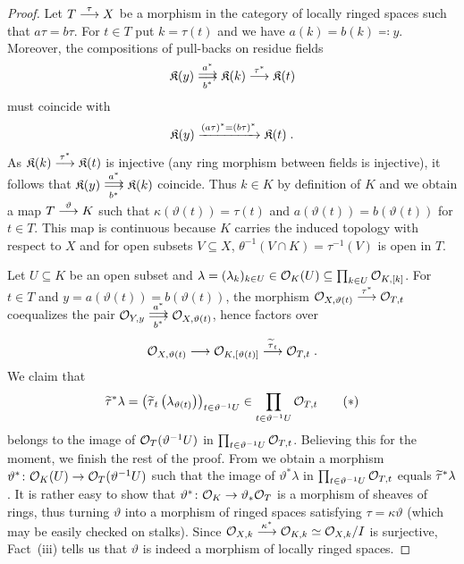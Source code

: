 \documentclass[a4paper,parskip=half,numbers=enddot, DIV=12]{scrreprt}
\begin{document}
\begin{proof}
	Let $T\morphism[\tau]X$ be a morphism in the category of locally ringed spaces such that $a\tau=b\tau$. For $t\in T$ put $k=\tau(t)$ and we have $a(k)=b(k)\eqqcolon y$. Moreover, the compositions of pull-backs on residue fields
	\begin{align*}
		\KK(y)\doublemorphism[\smash{a^*}][\smash{b^*}]\KK(k)\morphism[\tau^*]\KK(t)
	\end{align*}
	must coincide with
	\begin{align*}
		\mathfrak{K}(y)\xrightarrow{(a\tau)^*=(b\tau)^*}\mathfrak{K}(t)\;.
	\end{align*}
	As $\KK(k)\morphism[\tau^*]\KK(t)$ is injective (any ring morphism between fields is injective), it follows that $\KK(y)\doublemorphism[a^*][b^*]\KK(k)$ coincide. Thus $k\in K$ by definition of $K$ and we obtain a map $T\morphism[\vartheta]K$ such that $\kappa(\vartheta(t))=\tau(t)$ and $a(\vartheta(t))=b(\vartheta(t))$ for $t\in T$. This map is continuous because $K$ carries the induced topology with respect to $X$ and for open subsets $V\subseteq X$, $\theta^{-1}(V\cap K)=\tau^{-1}(V)$ is open in $T$.
	
	Let $U\subseteq K$ be an open subset and $\lambda=(\lambda_k)_{k\in U}\in\mathcal{O}_K(U)\subseteq\prod_{k\in U}\mathcal{O}_{K,[k]}$. For $t\in T$ and $y=a(\vartheta(t))=b(\vartheta(t))$, the morphism $\Oo_{X,\vartheta(t)}\morphism[\tau^*]\Oo_{T,t}$ coequalizes the pair $\Oo_{Y,y}\doublemorphism[\smash{a^*}][\smash{b^*}]\Oo_{X,\vartheta(t)}$, hence factors over
	\begin{align*}
		\Oo_{X,\vartheta(t)}\morphism\Oo_{K,[\vartheta(t)]}\morphism[\snake{\tau}_t]\Oo_{T,t}\;.
	\end{align*}
	We claim that
	\begin{align}\lbl{eq:bruteForcePullback}
		\snake{\tau}^*\lambda=\left(\snake{\tau}_t\left(\lambda_{\vartheta(t)}\right)\right)_{t\in\vartheta^{-1}U}\in\prod_{t\in\vartheta^{-1}U}\Oo_{T,t}\tag{$*$}
	\end{align}
	belongs to the image of $\mathcal{O}_T(\vartheta^{-1}U)$ in $\prod_{t\in\vartheta^{-1}U}\mathcal{O}_{T,t}$. Believing this for the moment, we finish the rest of the proof. From  we obtain a morphism $\vartheta^*\colon\Oo_K(U)\morphism\Oo_T(\vartheta^{-1}U)$ such that the image of $\vartheta^*\lambda$ in $\prod_{t\in\vartheta^{-1}U}\mathcal{O}_{T,t}$ equals $\snake{\tau}^*\lambda$. It is rather easy to show that $\vartheta^*\colon\Oo_K\morphism\vartheta_*\Oo_T$ is a morphism of sheaves of rings, thus turning $\vartheta$ into a morphism of ringed spaces satisfying $\tau=\kappa\vartheta$ (which may be easily checked on stalks). Since $\Oo_{X,k}\morphism[\kappa^*]\Oo_{K,k}\simeq\Oo_{X,k}/I$ is surjective, Fact~(iii) tells us that $\vartheta$ is indeed a morphism of locally ringed spaces.
	

\end{proof}
\end{document}

